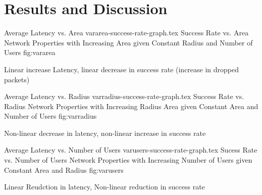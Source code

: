 \section{Results and Discussion}

    {Average Latency vs. Area}
                 {vararea-success-rate-graph.tex}       {Success Rate vs. Area}
     {Network Properties with Increasing Area given Constant Radius and Number of Users}
     {fig:vararea}
\par
Linear increase Latency, linear decrease in success rate (increase in dropped packets)

  {Average Latency vs. Radius}
                 {varradius-success-rate-graph.tex}     {Success Rate vs. Radius}
    {Network Properties with Increasing Radius Area given Constant Area and Number of Users}
    {fig:varradius}
\par
Non-linear decrease in latency, non-linear increase in success rate

   {Average Latency vs. Number of Users}
                 {varusers-success-rate-graph.tex}      {Sucess Rate vs. Number of Users}
    {Network Properties with Increasing Number of Users given Constant Area and Radius}
    {fig:varusers}
\par
Linear Reudction in latency, Non-linear reduction in success rate
